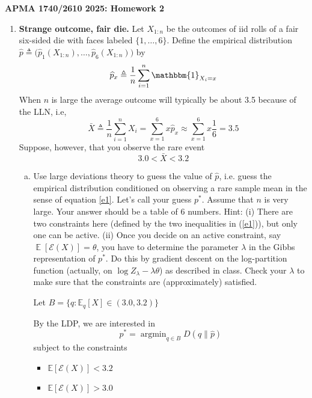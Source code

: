 \documentclass[11pt]{report}
\DeclareMathOperator{\Exp}{\mathbb{E}}
\DeclareMathOperator*{\argmin}{\arg\min}
\newcommand{\ind}{{\mathbbm{1}}}
\newcommand{\E}{\mathbb{E}}
\newcommand{\Ec}{\mathcal{E}}
\begin{document}
\begin{center}
    {\bf\large APMA 1740/2610 2025: Homework 2}
\end{center}
\medskip


\begin{enumerate}[1.]

    \item {\bf Strange outcome, fair die.} Let $X_{1:n}$ be the outcomes of iid rolls of a fair six-sided die with faces labeled $\{1,\dotsc,6\}$.
          Define the empirical distribution $\widehat p \triangleq \bigl(\widehat p_1(X_{1:n}),\dotsc,\widehat p_6(X_{1:n})\bigr)$ by
          \[ \widehat p_x \triangleq \frac{1}{n}\sum_{i=1}^n \ind_{X_i=x} \]
          When $n$ is large the average outcome will typically be about 3.5 because of the LLN, i.e,
          \[ \bar X \triangleq \frac{1}{n}\sum_{i=1}^n X_i = \sum_{x=1}^6 x \widehat p_x \approx \sum_{x=1}^6 x \frac{1}{6} = 3.5 \]
          Suppose, however, that you observe the rare event
          \begin{equation} 3.0 < \bar X < 3.2 \label{e1} \end{equation}

          \begin{enumerate}[(a)]

              \item Use large deviations theory to guess the value of $\widehat p$,
                    i.e. guess the empirical distribution conditioned on observing a rare sample mean in the sense of equation \eqref{e1}.
                    Let's call your guess $p^*$.  Assume that $n$ is very large.  Your answer should be a table of 6 numbers.  Hint: (i) There are two constraints here
                    (defined by the two inequalities in (\ref{e1})), but only one can be active.  (ii) Once you decide on an active constraint, say $\Exp[{\mathcal E}(X)]=\theta$, you have to determine the parameter $\lambda$ in the Gibbs representation of $p^*$.  Do this by gradient descent on the log-partition function (actually, on $\log Z_\lambda - \lambda\theta$) as described in class.  Check your $\lambda$ to make sure that the constraints are (approximately) satisfied.

                    \color{blue}
                    Let $B = \{q: \E_q[X] \in (3.0, 3.2)\}$

                    By the LDP, we are interested in
                    \[p^* = \argmin_{q \in B} D(q \parallel \hat p)\]
                    subject to the constraints
                    \begin{itemize}
                        \item $\E[\Ec(X)] < 3.2$
                        \item $\E[\Ec(X)] > 3.0$
                    \end{itemize}


\end{enumerate}
\end{enumerate}
\end{document}
